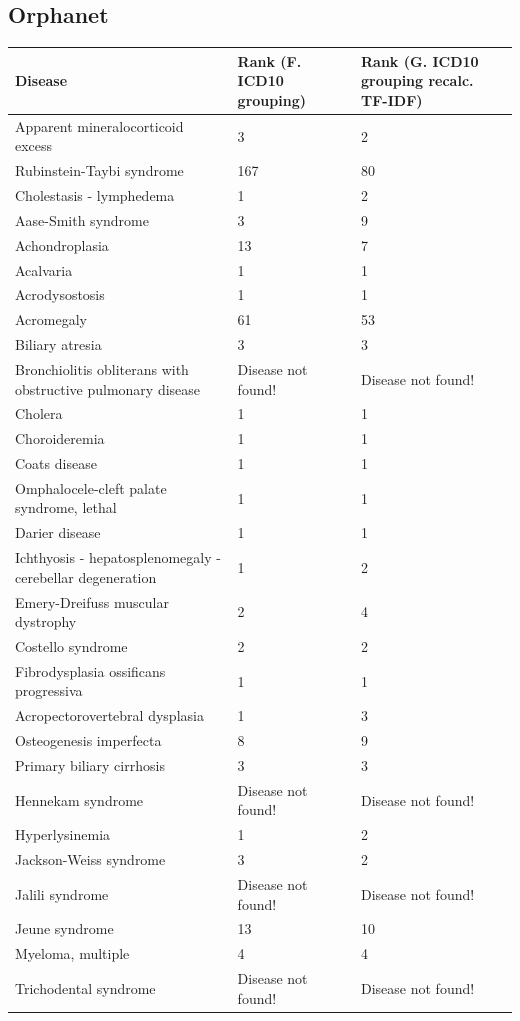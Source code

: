 \documentclass[10pt,letterpaper,two column,final]{article}
\begin{document}
\subsection{Orphanet}
\label{app:orphanet_icd10_icd10recalc}
\begin{center}
\begin{small}
	\begin{longtable}{|p{6cm}|p{2.5cm}|p{2.5cm}|}
	\hline
	\textbf{Disease}  & \textbf{Rank (F. ICD10 grouping)} & \textbf{Rank (G. ICD10 grouping recalc. TF-IDF)} \\
	\hline\hline
Apparent mineralocorticoid excess & 3 & 2\\    \hline
Rubinstein-Taybi syndrome & 167 & 80\\    \hline
Cholestasis - lymphedema & 1 & 2\\    \hline
Aase-Smith syndrome & 3 & 9\\    \hline
Achondroplasia & 13 & 7\\    \hline
Acalvaria & 1 & 1\\    \hline
Acrodysostosis & 1 & 1\\    \hline
Acromegaly & 61 & 53\\    \hline
Biliary atresia & 3 & 3\\    \hline
Bronchiolitis obliterans with obstructive pulmonary disease & Disease not found!  & Disease not found!\\    \hline
Cholera & 1 & 1\\    \hline
Choroideremia & 1 & 1\\    \hline
Coats disease & 1 & 1\\    \hline
Omphalocele-cleft palate syndrome, lethal & 1 & 1\\    \hline
Darier disease & 1 & 1\\    \hline
Ichthyosis - hepatosplenomegaly - cerebellar degeneration & 1 & 2\\    \hline
Emery-Dreifuss muscular dystrophy & 2 & 4\\    \hline
Costello syndrome & 2 & 2\\    \hline
Fibrodysplasia ossificans progressiva & 1 & 1\\    \hline
Acropectorovertebral dysplasia & 1 & 3\\    \hline
Osteogenesis imperfecta & 8 & 9\\    \hline
Primary biliary cirrhosis & 3 & 3\\    \hline
Hennekam syndrome & Disease not found!  & Disease not found!\\    \hline
Hyperlysinemia & 1 & 2\\    \hline
Jackson-Weiss syndrome & 3 & 2\\    \hline
Jalili syndrome & Disease not found!  & Disease not found!\\    \hline
Jeune syndrome & 13 & 10\\    \hline
Myeloma, multiple & 4 & 4\\    \hline
Trichodental syndrome & Disease not found!  & Disease not found!\\    \hline
	\end{longtable}
	\label{tab:orphanet_icd10_icd10recalc}
\end{small}
\end{center}
\end{document}
